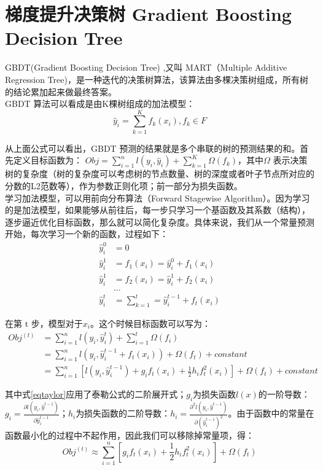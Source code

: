 \documentclass[a4paper]{article}
\begin{document}
\section{梯度提升决策树 Gradient Boosting Decision Tree}

GBDT(Gradient Boosting Decision Tree) ,又叫 MART（Multiple Additive Regression Tree)，是一种迭代的决策树算法，该算法由多棵决策树组成，所有树的结论累加起来做最终答案。\\

GBDT 算法可以看成是由K棵树组成的加法模型：
\begin{equation}
\hat{y}_i=\sum_{k=1}^{K}f_k(x_i),f_k\in F
\end{equation}

从上面公式可以看出，GBDT 预测的结果就是多个串联的树的预测结果的和。首先定义目标函数为： $Obj=\sum_{i=1}^n l(y_i, \hat{y}_i) + \sum_{k=1}^K \Omega(f_k)，其中\Omega$ 表示决策树的复杂度（树的复杂度可以考虑树的节点数量、树的深度或者叶子节点所对应的分数的L2范数等），作为参数正则化项；前一部分为损失函数。\\

学习加法模型，可以用前向分布算法（Forward Stagewise Algorithm）。因为学习的是加法模型，如果能够从前往后，每一步只学习一个基函数及其系数（结构），逐步逼近优化目标函数，那么就可以简化复杂度。具体来说，我们从一个常量预测开始，每次学习一个新的函数，过程如下：
\begin{align}
	\hat{y}_i^0&=0\\
	\hat{y}_i^1&=f_1(x_i)=\hat{y}_i^0+f_1(x_i)\\
	\hat{y}_i^1&=f_2(x_i)=\hat{y}_i^1+f_2(x_i)\\
	&\ldots\\
	\hat{y}_i^t&=\sum_{k=1}^{t}=\hat{y}_i^{t-1}+f_t(x_i)
\end{align}

在第 t 步，模型对于$x_i$。这个时候目标函数可以写为：
\begin{align}
Obj^{(t)}&=\sum_{i=1}^{n} l(y_i,\hat{y}_i^t)+\sum_{i=1}^{t}\Omega(f_i)\\
&=\sum_{i=1}^{n} l(y_i,\hat{y}_i^{t-1}+f_t(x_i))+\Omega(f_t)+constant\\
&=\sum_{i=1}^{n} [l(y_i,\hat{y}_i^{t-1})+g_i f_t(x_i)+\frac{1}{2}h_i f^2_t(x_i)]+\Omega(f_t)+constant\label{eqtaylor}
\end{align}

其中式\ref{eqtaylor}应用了泰勒公式的二阶展开式；$g_i$为损失函数$l(x)$的一阶导数：$g_i=\frac{\partial l(y_i,\hat{y}^{t-1})}{\partial \hat{y}_i^{t-1}}$；$h_i$为损失函数的二阶导数：$h_i=\frac{\partial^2 l(y_i,\hat{y}^{t-1})}{\partial (\hat{y}_i^{t-1})^2}$。由于函数中的常量在函数最小化的过程中不起作用，因此我们可以移除掉常量项，得：
\begin{equation}\label{eqobj}
Obj^{(t)}\approx \sum_{i=1}^{n} [g_i f_t(x_i)+\frac{1}{2}h_i f^2_t(x_i)]+\Omega(f_t)
\end{equation}
\end{document}
